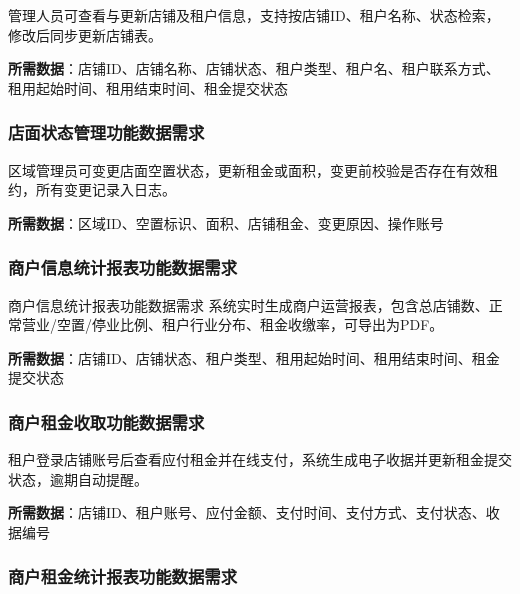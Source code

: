 \documentclass[]{article}
\begin{document}
管理人员可查看与更新店铺及租户信息，支持按店铺ID、租户名称、状态检索，修改后同步更新店铺表。

\textbf{所需数据}：店铺ID、店铺名称、店铺状态、租户类型、租户名、租户联系方式、租用起始时间、租用结束时间、租金提交状态

\hypertarget{ux5e97ux9762ux72b6ux6001ux7ba1ux7406ux529fux80fdux6570ux636eux9700ux6c42}{%
  \subsubsection{店面状态管理功能数据需求}\label{ux5e97ux9762ux72b6ux6001ux7ba1ux7406ux529fux80fdux6570ux636eux9700ux6c42}}

区域管理员可变更店面空置状态，更新租金或面积，变更前校验是否存在有效租约，所有变更记录入日志。

\textbf{所需数据}：区域ID、空置标识、面积、店铺租金、变更原因、操作账号

\hypertarget{ux5546ux6237ux4fe1ux606fux7edfux8ba1ux62a5ux8868ux529fux80fdux6570ux636eux9700ux6c42}{%
  \subsubsection{商户信息统计报表功能数据需求}\label{ux5546ux6237ux4fe1ux606fux7edfux8ba1ux62a5ux8868ux529fux80fdux6570ux636eux9700ux6c42}}

商户信息统计报表功能数据需求
系统实时生成商户运营报表，包含总店铺数、正常营业/空置/停业比例、租户行业分布、租金收缴率，可导出为PDF。

\textbf{所需数据}：店铺ID、店铺状态、租户类型、租用起始时间、租用结束时间、租金提交状态

\hypertarget{ux5546ux6237ux79dfux91d1ux6536ux53d6ux529fux80fdux6570ux636eux9700ux6c42}{%
  \subsubsection{商户租金收取功能数据需求}\label{ux5546ux6237ux79dfux91d1ux6536ux53d6ux529fux80fdux6570ux636eux9700ux6c42}}

租户登录店铺账号后查看应付租金并在线支付，系统生成电子收据并更新租金提交状态，逾期自动提醒。

\textbf{所需数据}：店铺ID、租户账号、应付金额、支付时间、支付方式、支付状态、收据编号

\hypertarget{ux5546ux6237ux79dfux91d1ux7edfux8ba1ux62a5ux8868ux529fux80fdux6570ux636eux9700ux6c42}{%
  \subsubsection{商户租金统计报表功能数据需求}\label{ux5546ux6237ux79dfux91d1ux7edfux8ba1ux62a5ux8868ux529fux80fdux6570ux636eux9700ux6c42}}
\end{document}
